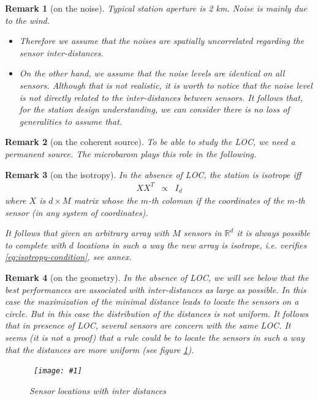 \documentclass[a4paper, 12pt]{report}
\newcommand{\figscale}[4]{
\begin{figure}[hbtp]
\centerline{
    \hbox{ \texttt{[image: \#1]} }
}
\begin{center}
\parbox{12 cm}
{
    \caption{\protect\small\it  {#2}}
    \label {#3}
}
\end{center}

\end{figure}}
\newtheorem{remark}{Remark}
\begin{document}
\begin{remark}[on the noise]
Typical station aperture  is 2 km. Noise is mainly due to the wind.
\begin{itemize}
\item
Therefore we assume that the noises are spatially uncorrelated regarding the sensor inter-distances.
\item
On the other hand, we assume that the noise levels are identical on all sensors. Although that is not realistic, it is worth to notice that the noise level is not directly related to the inter-distances between sensors. It follows that, for the station design understanding, we can consider there is no loss of generalities to assume that.
\end{itemize}
\end{remark}

\begin{remark}[on the coherent source]
To be able to study the LOC, we need a permanent source. The microbarom plays this role in the following.
\end{remark}

\begin{remark}[on the isotropy]
In the absence of LOC, the station is isotrope iff 
\begin{eqnarray}
 \label{eq:isotropy-condition}
XX^{T}&\propto&I_{d}
\end{eqnarray}
where $X$ is $d\times M$ matrix whose the $m$-th colomun if the coordinates of the $m$-th sensor (in any  system of coordinates). 

It follows that  given an arbitrary array with $M$ sensors in $\mathds{R}^{d}$ it is always possible to complete with $d$ locations in such a way the new array is isotrope, i.e. verifies \eqref{eq:isotropy-condition}, see annex.

\end{remark}

\begin{remark}[on the geometry]
In the absence of LOC, we will see below that the best performances are associated with inter-distances as large as possible. In this case the maximization of the minimal distance leads to locate the sensors on a circle. But in this case the distribution of the distances is not uniform. It follows that in presence of LOC, several sensors are concern with the same LOC. It seems (it is not a proof) that a rule could be to locate the sensors in such a way that the distances are more uniform (see figure \ref{fig:uniforinterdistances}).

\figscale{../figures/uniforinterdistances.pdf}{Sensor locations with inter distances}{fig:uniforinterdistances}{0.9}

\end{remark}
\end{document}
